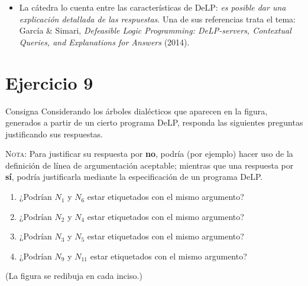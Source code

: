 \documentclass[11pt,a4paper]{article}
\begin{document}
\begin{extras}
\begin{itemize}
  \item La cátedra lo cuenta entre las características de DeLP: \textit{es posible dar una explicación detallada de las respuestas}. Una de sus referencias trata el tema: García \& Simari, \textit{Defeasible Logic Programming: DeLP-servers, Contextual Queries, and Explanations for Answers} (2014).
\end{itemize}
\end{extras}

\section{Ejercicio 9}

\newcommand{\arbolesNueve}[1]{%
\begin{tikzpicture}
  \foreach \n/\x/\y/\m/\c in {1/1.5/0/U/azul, 2/0.6/-1.5/D/ambar, 3/0.6/-3/U/azul, 4/2.4/-1.5/D/ambar, 5/2.4/-3/U/azul,
                              6/6/0/D/ambar, 7/5.1/-1.5/U/azul, 8/5.1/-3/D/ambar, 9/5.1/-4.5/U/azul, 10/6.9/-1.5/D/ambar, 11/6.9/-3/U/azul} {
    \coordinate (N\n) at (\x,\y);
    \tri{\x}{\y}{0.42}{0.9}{$N_{\n}$}{}{\c}
    \node[font=\scriptsize\bfseries, text=\c] at (\x-0.6,\y+0.6) {\m};
  }
  \foreach \p/\h in {1/2, 1/4, 2/3, 4/5, 6/7, 6/10, 7/8, 8/9, 10/11} {
    \draw[gris, thick] (N\p) -- ($(N\h)+(0,0.9)$);
  }
  #1
\end{tikzpicture}}
\newcommand{\resaltar}[1]{\draw[red!70!black, very thick] ($(#1)+(-0.62,-0.12)$) -- ($(#1)+(0,1.15)$) -- ($(#1)+(0.62,-0.12)$) -- cycle;}

\begin{enunciado}{Consigna}
Considerando los árboles dialécticos que aparecen en la figura, generados a partir de un cierto programa DeLP, responda las siguientes preguntas justificando sus respuestas.

\textsc{Nota}: Para justificar su respuesta por \textbf{no}, podría (por ejemplo) hacer uso de la definición de línea de argumentación aceptable; mientras que una respuesta por \textbf{sí}, podría justificarla mediante la especificación de un programa DeLP.
\begin{enumerate}[label=\alph*.]
  \item ¿Podrían $N_1$ y $N_6$ estar etiquetados con el mismo argumento?
  \item ¿Podrían $N_2$ y $N_4$ estar etiquetados con el mismo argumento?
  \item ¿Podrían $N_3$ y $N_5$ estar etiquetados con el mismo argumento?
  \item ¿Podrían $N_9$ y $N_{11}$ estar etiquetados con el mismo argumento?
\end{enumerate}
(La figura se redibuja en cada inciso.)
\end{enunciado}
\end{document}
